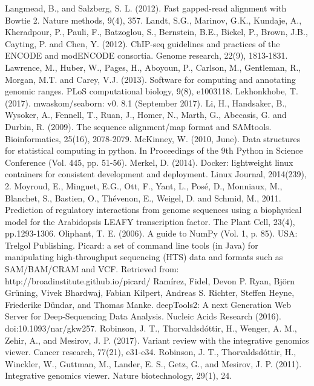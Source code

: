 \documentclass{article}
\begin{document}
\begin{sloppypar}
\begin{thebibliography}{9}
Langmead, B., and Salzberg, S. L. (2012). Fast gapped-read alignment with Bowtie 2. Nature methods, 9(4), 357.
Landt, S.G., Marinov, G.K., Kundaje, A., Kheradpour, P., Pauli, F., Batzoglou, S., Bernstein, B.E., Bickel, P., Brown, J.B., Cayting, P. and Chen, Y. (2012). ChIP-seq guidelines and practices of the ENCODE and modENCODE consortia. Genome research, 22(9), 1813-1831.
Lawrence, M., Huber, W., Pages, H., Aboyoun, P., Carlson, M., Gentleman, R., Morgan, M.T. and Carey, V.J. (2013). Software for computing and annotating genomic ranges. PLoS computational biology, 9(8), e1003118.
Lekhonkhobe, T. (2017). mwaskom/seaborn: v0. 8.1 (September 2017). 
Li, H., Handsaker, B., Wysoker, A., Fennell, T., Ruan, J., Homer, N., Marth, G., Abecasis, G. and Durbin, R. (2009). The sequence alignment/map format and SAMtools. Bioinformatics, 25(16), 2078-2079.
McKinney, W. (2010, June). Data structures for statistical computing in python. In Proceedings of the 9th Python in Science Conference (Vol. 445, pp. 51-56).
Merkel, D. (2014). Docker: lightweight linux containers for consistent development and deployment. Linux Journal, 2014(239), 2.
Moyroud, E., Minguet, E.G., Ott, F., Yant, L., Posé, D., Monniaux, M., Blanchet, S., Bastien, O., Thévenon, E., Weigel, D. and Schmid, M., 2011. Prediction of regulatory interactions from genome sequences using a biophysical model for the Arabidopsis LEAFY transcription factor. The Plant Cell, 23(4), pp.1293-1306.
Oliphant, T. E. (2006). A guide to NumPy (Vol. 1, p. 85). USA: Trelgol Publishing.
Picard: a set of command line tools (in Java) for manipulating high-throughput sequencing (HTS) data and formats such as SAM/BAM/CRAM and VCF. Retrieved from: http://broadinstitute.github.io/picard/
Ramírez, Fidel, Devon P. Ryan, Björn Grüning, Vivek Bhardwaj, Fabian Kilpert, Andreas S. Richter, Steffen Heyne, Friederike Dündar, and Thomas Manke. deepTools2: A next Generation Web Server for Deep-Sequencing Data Analysis. Nucleic Acids Research (2016). doi:10.1093/nar/gkw257.
Robinson, J. T., Thorvaldsdóttir, H., Wenger, A. M., Zehir, A., and Mesirov, J. P. (2017). Variant review with the integrative genomics viewer. Cancer research, 77(21), e31-e34.
Robinson, J. T., Thorvaldsdóttir, H., Winckler, W., Guttman, M., Lander, E. S., Getz, G., and Mesirov, J. P. (2011). Integrative genomics viewer. Nature biotechnology, 29(1), 24.

\end{thebibliography}
\end{sloppypar}
\end{document}
